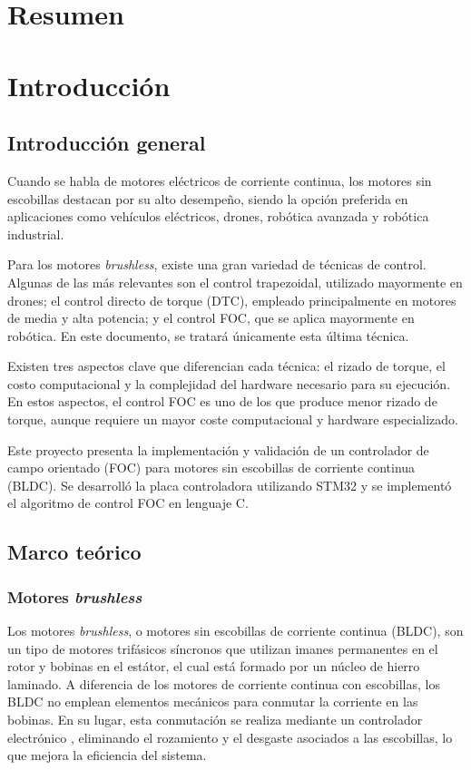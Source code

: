 \documentclass[11pt]{report}
\begin{document}
\normalsize
{}
\setcounter{page}{3}

\newpage
\tableofcontents



\newpage
\chapter*{Resumen}

\newpage
\chapter{Introducción}
\section{Introducción general}
Cuando se habla de motores eléctricos de corriente continua, los motores sin escobillas destacan por su alto desempeño, siendo la opción preferida en aplicaciones como vehículos eléctricos, drones, robótica avanzada y robótica industrial.

Para los motores \textit{brushless}, existe una gran variedad de técnicas de control. Algunas de las más relevantes son el control trapezoidal, utilizado mayormente en drones; el control directo de torque (DTC), empleado principalmente en motores de media y alta potencia; y el control FOC, que se aplica mayormente en robótica. En este documento, se tratará únicamente esta última técnica.

Existen tres aspectos clave que diferencian cada técnica: el rizado de torque, el costo computacional y la complejidad del hardware necesario para su ejecución. En estos aspectos, el control FOC es uno de los que produce menor rizado de torque, aunque requiere un mayor coste computacional y hardware especializado.

Este proyecto presenta la implementación y validación de un controlador de campo orientado (FOC) para motores sin escobillas de corriente continua (BLDC). Se desarrolló la placa controladora utilizando STM32 y se implementó el algoritmo de control FOC en lenguaje C.

\newpage
\section{Marco teórico}
\subsection{Motores \textit{brushless}}
Los motores \textit{brushless}, o motores sin escobillas de corriente continua (BLDC), son un tipo de motores trifásicos síncronos que utilizan imanes permanentes en el rotor y bobinas en el estátor, el cual está formado por un núcleo de hierro laminado. A diferencia de los motores de corriente continua con escobillas, los BLDC no emplean elementos mecánicos para conmutar la corriente en las bobinas. En su lugar, esta conmutación se realiza mediante un controlador electrónico \cite{frick2018bldc}, eliminando el rozamiento y el desgaste asociados a las escobillas, lo que mejora la eficiencia del sistema.
\end{document}
